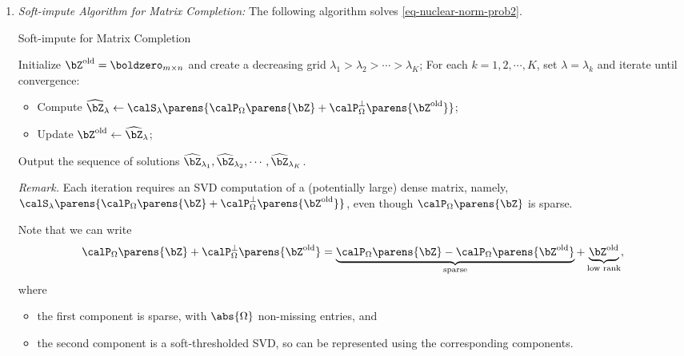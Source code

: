 \documentclass[12pt]{article}
\begin{document}
\begin{enumerate}[label=\textbf{\arabic*.}]
\begin{enumerate}
		\item \textit{Soft-impute Algorithm for Matrix Completion:} The following algorithm solves \eqref{eq-nuclear-norm-prob2}. 
		
		\begin{minipage}{\linewidth}
			\begin{algorithm}[H]
			\caption{Soft-impute for Matrix Completion}\label{algo-soft-impute}
			\begin{algorithmic}[1]
				\STATE Initialize $\bZ^{\mathrm{old}} = \boldzero_{m \times n}$ and create a decreasing grid $\lambda_1 > \lambda_2 > \cdots > \lambda_K$; 
				\STATE For each $k = 1, 2, \cdots, K$, set $\lambda = \lambda_k$ and iterate until convergence: 
				\begin{itemize}
					\item Compute $\widehat{\bZ}_{\lambda} \leftarrow \calS_{\lambda} \parens{\calP_{\Omega} \parens{\bZ} + \calP_{\Omega}^{\perp} \parens{\bZ^{\mathrm{old}}} }$; 
					\item Update $\bZ^{\mathrm{old}} \leftarrow \widehat{\bZ}_{\lambda}$; 
				\end{itemize}
				\STATE Output the sequence of solutions $\widehat{\bZ}_{\lambda_1}, \widehat{\bZ}_{\lambda_2}, \cdots, \widehat{\bZ}_{\lambda_K}$. 
			\end{algorithmic}
		\end{algorithm}
		\end{minipage}
		
		\vspace{10pt}
		\textit{Remark.} Each iteration requires an SVD computation of a (potentially large) dense matrix, namely, $\calS_{\lambda} \parens{\calP_{\Omega} \parens{\bZ} + \calP_{\Omega}^{\perp} \parens{\bZ^{\mathrm{old}}} }$, even though $\calP_{\Omega} \parens{\bZ}$ is sparse. 
		
		Note that we can write 
		\begin{align*}
			\calP_{\Omega} \parens{\bZ} + \calP_{\Omega}^{\perp} \parens{\bZ^{\mathrm{old}}} = \underbrace{\calP_{\Omega} \parens{\bZ} - \calP_{\Omega} \parens{\bZ^{\mathrm{old}}}}_{\text{sparse}} + \underbrace{\bZ^{\mathrm{old}}}_{\text{low rank}}, 
		\end{align*}
		where 
		\begin{itemize}
			\item the first component is sparse, with $\abs{\Omega}$ non-missing entries, and 
			\item the second component is a soft-thresholded SVD, so can be represented using the corresponding components. 
		\end{itemize}
	\end{enumerate}
	
\end{enumerate}
\end{document}
